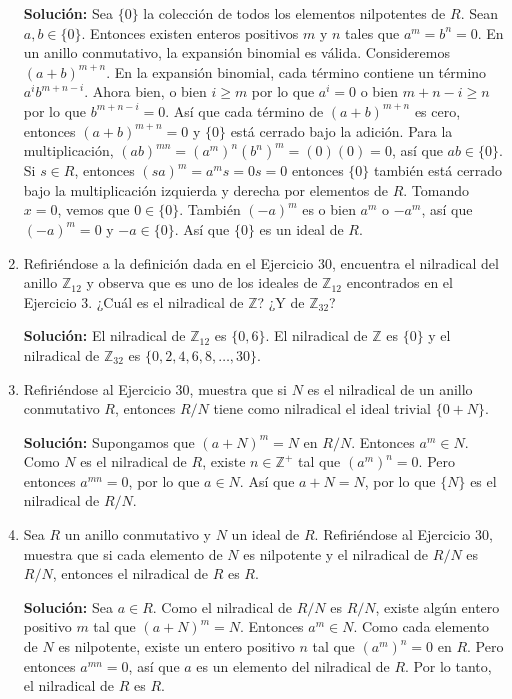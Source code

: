 \begin{enumerate}
\textbf{Solución:}
Sea $\{0\}$ la colección de todos los elementos nilpotentes de $R$. Sean $a, b \in \{0\}$. Entonces existen enteros positivos $m$ y $n$ tales que $a^m = b^n = 0$. En un anillo conmutativo, la expansión binomial es válida. Consideremos $(a + b)^{m+n}$. En la expansión binomial, cada término contiene un término $a^i b^{m+n-i}$. Ahora bien, o bien $i \geq m$ por lo que $a^i = 0$ o bien $m + n - i \geq n$ por lo que $b^{m+n-i} = 0$. Así que cada término de $(a + b)^{m+n}$ es cero, entonces $(a + b)^{m+n} = 0$ y $\{0\}$ está cerrado bajo la adición. Para la multiplicación, $(ab)^{mn} = (a^m)^n (b^n)^m = (0)(0) = 0$, así que $ab \in \{0\}$. Si $s \in R$, entonces $(sa)^m = a^m s = 0s = 0$ entonces $\{0\}$ también está cerrado bajo la multiplicación izquierda y derecha por elementos de $R$. Tomando $x = 0$, vemos que $0 \in \{0\}$. También $(-a)^m$ es o bien $a^m$ o $-a^m$, así que $(-a)^m = 0$ y $-a \in \{0\}$. Así que $\{0\}$ es un ideal de $R$.

\item Refiriéndose a la definición dada en el Ejercicio 30, encuentra el nilradical del anillo $\mathbb{Z}_{12}$ y observa que es uno de los ideales de $\mathbb{Z}_{12}$ encontrados en el Ejercicio 3. ¿Cuál es el nilradical de $\mathbb{Z}$? ¿Y de $\mathbb{Z}_{32}$?

\textbf{Solución:}
 El nilradical de $\mathbb{Z}_{12}$ es $\{0, 6\}$. El nilradical de $\mathbb{Z}$ es $\{0\}$ y el nilradical de $\mathbb{Z}_{32}$ es $\{0, 2, 4, 6, 8, \dots, 30\}$.

\item  Refiriéndose al Ejercicio 30, muestra que si $N$ es el nilradical de un anillo conmutativo $R$, entonces $R/N$ tiene como nilradical el ideal trivial $\{0 + N\}$.

\textbf{Solución:}
Supongamos que $(a + N)^{m} = N$ en $R/N$. Entonces $a^{m} \in N$. Como $N$ es el nilradical de $R$, existe $n \in \mathbb{Z}^{+}$ tal que $(a^{m})^{n} = 0$. Pero entonces $a^{mn} = 0$, por lo que $a \in N$. Así que $a + N = N$, por lo que $\{N\}$ es el nilradical de $R/N$.

\item Sea $R$ un anillo conmutativo y $N$ un ideal de $R$. Refiriéndose al Ejercicio 30, muestra que si cada elemento de $N$ es nilpotente y el nilradical de $R/N$ es $R/N$, entonces el nilradical de $R$ es $R$.

\textbf{Solución:}
Sea $a \in R$. Como el nilradical de $R/N$ es $R/N$, existe algún entero positivo $m$ tal que $(a + N)^{m} = N$. Entonces $a^{m} \in N$. Como cada elemento de $N$ es nilpotente, existe un entero positivo $n$ tal que $(a^{m})^{n} = 0$ en $R$. Pero entonces $a^{mn} = 0$, así que $a$ es un elemento del nilradical de $R$. Por lo tanto, el nilradical de $R$ es $R$.


\end{enumerate}
